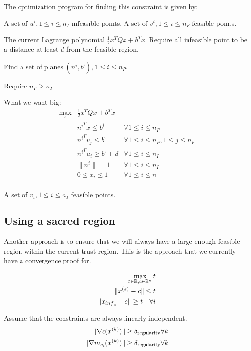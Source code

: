 The optimization program for finding this constraint is given by:

A set of $u^i, 1 \le i \le n_{I}$ infeasible points.
A set of $v^i, 1 \le i \le n_{F}$ feasible points.

The current Lagrange polynomial $\frac 1 2 x^T Q x + b^Tx$.
Require all infeasible point to be a distance at least $d$ from the feasible region.


Find a set of planes $(n^i, b^i), 1 \le i \le n_{P}$.

Require $n_P \ge n_I$.


What we want big:
\begin{align}
\max_{x} & \frac 1 2 x^T Q x + b^Tx &\\
 & {n^i}^T x \le b^i & \forall 1 \le i \le n_{P} \\
 & {n^i}^T v_j \le b^i & \forall 1 \le i \le n_{P}, 1\le j\le  n_{F} \\
 & {n^i}^T u_i \ge b^i + d & \forall 1 \le i \le n_{I} \\
 & \| n^i \| = 1 & \forall 1 \le i \le n_{I} \\
 & 0 \le x_i \le 1 & \forall 1 \le i \le n \\
\end{align}


A set of $v_i, 1 \le i \le n_{I}$ feasible points.




\subsection{Using a sacred region}


Another approach is to ensure that we will always have a large enough feasible region within the current trust region.
This is the approach that we currently have a convergence proof for.


\begin{align*}
\max_{t \in \mathbb R, c \in \mathbb R^n} t \\
\| {x^{(k)}} - c\| \le t \\
\| {x_{inf}}_i - c \| \ge t \quad \forall i
\end{align*}



Assume that the constraints are always linearly independent.
\begin{align*}
\|\nabla c({x^{(k)}})\| \ge {\delta_{\text{regularity}}} \forall k\\
\|\nabla m_{c_{i}}({x^{(k)}})\| \ge {\delta_{\text{regularity}}} \forall k
\end{align*}


